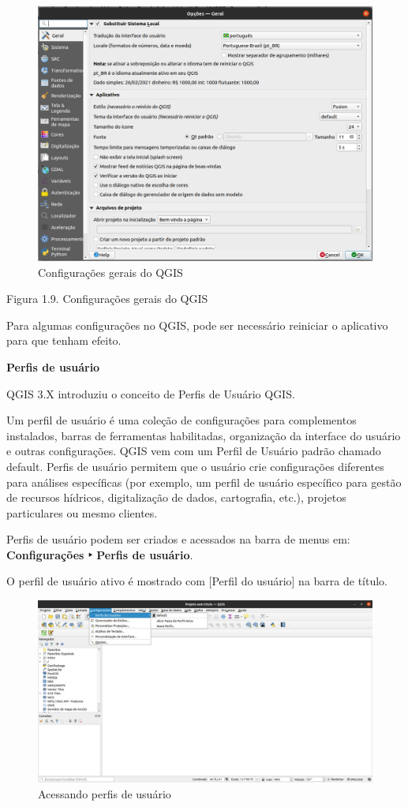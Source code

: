 \documentclass[
]{book}
\begin{document}
\begin{figure}
\centering
\includegraphics{media/modulo1/change-theme.png}
\caption{Configurações gerais do QGIS}
\end{figure}

Figura 1.9. Configurações gerais do QGIS

Para algumas configurações no QGIS, pode ser necessário reiniciar o aplicativo para que tenham efeito.

\textbf{Perfis de usuário}

QGIS 3.X introduziu o conceito de Perfis de Usuário QGIS.

Um perfil de usuário é uma coleção de configurações para complementos instalados, barras de ferramentas habilitadas, organização da interface do usuário e outras configurações. QGIS vem com um Perfil de Usuário padrão chamado default. Perfis de usuário permitem que o usuário crie configurações diferentes para análises específicas (por exemplo, um perfil de usuário específico para gestão de recursos hídricos, digitalização de dados, cartografia, etc.), projetos particulares ou mesmo clientes.

Perfis de usuário podem ser criados e acessados na barra de menus em: \textbf{Configurações ‣ Perfis de usuário}.

O perfil de usuário ativo é mostrado com {[}Perfil do usuário{]} na barra de título.

\begin{figure}
\centering
\includegraphics{media/modulo1/user-profiles-1.png}
\caption{Acessando perfis de usuário}
\end{figure}
\end{document}
